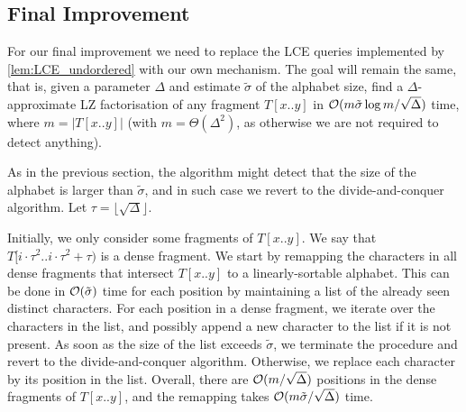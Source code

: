  
\subsection{Final Improvement}
\label{sec:finalimprov}


For our final improvement we need to replace the LCE queries implemented by \cref{lem:LCE_undordered} with our own
mechanism.
The goal will remain the same, that is, given a parameter $\Delta$ and estimate $\tilde{\sigma}$ of the alphabet size,
find a $\Delta$-approximate LZ factorisation of any fragment $T[x..y]$ in $\mathcal{O}(m\tilde{\sigma}\log m/\sqrt{\Delta})$ time, where $m=|T[x..y]|$ (with $m=\Theta(\Delta^2)$, as otherwise we are not required to detect anything).

As in the previous section, the algorithm might detect that the size of the alphabet is larger
than $\tilde{\sigma}$, and in such case we revert to the divide-and-conquer algorithm. Let $\tau=\lfloor\sqrt{\Delta}\rfloor$.

Initially, we only consider some fragments of $T[x..y]$. We say that $T[i\cdot \tau^{2}..i\cdot \tau^{2} + \tau)$ is a dense fragment.
We start by remapping the characters in all dense fragments that intersect $T[x..y]$ to a linearly-sortable alphabet. This can be done
in $\mathcal{O}(\tilde{\sigma})$ time for each position by maintaining a list of the already seen distinct characters. For each position in a dense fragment,
we iterate over the characters in the list, and possibly append a new character to the list if it is not present. As soon as the size of
the list exceeds $\tilde{\sigma}$, we terminate the procedure and revert to the divide-and-conquer algorithm. Otherwise, we replace each character by its position in the list.
Overall, there are $\mathcal{O}(m/\sqrt{\Delta})$ positions in the dense fragments of $T[x..y]$, and the remapping takes $\mathcal{O}(m\tilde{\sigma}/\sqrt{\Delta})$ time.

